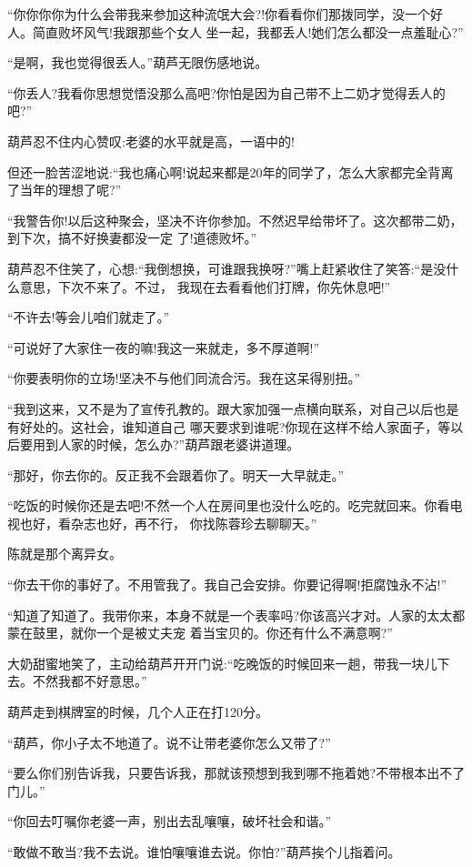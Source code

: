 \documentclass[11pt,a4paper,onecolumn]{article}
\begin{document}
``你你你你为什么会带我来参加这种流氓大会?!你看看你们那拨同学，没一个好人。简直败坏风气!我跟那些个女人
坐一起，我都丢人!她们怎么都没一点羞耻心?''

``是啊，我也觉得很丢人。''葫芦无限伤感地说。

``你丢人?我看你思想觉悟没那么高吧?你怕是因为自己带不上二奶才觉得丢人的吧?''

葫芦忍不住内心赞叹:老婆的水平就是高，一语中的!

但还一脸苦涩地说:``我也痛心啊!说起来都是20年的同学了，怎么大家都完全背离了当年的理想了呢?''

``我警告你!以后这种聚会，坚决不许你参加。不然迟早给带坏了。这次都带二奶，到下次，搞不好换妻都没一定
了!道德败坏。''

葫芦忍不住笑了，心想:``我倒想换，可谁跟我换呀?''嘴上赶紧收住了笑答:``是没什么意思，下次不来了。不过，
我现在去看看他们打牌，你先休息吧!''

``不许去!等会儿咱们就走了。''

``可说好了大家住一夜的嘛!我这一来就走，多不厚道啊!''

``你要表明你的立场!坚决不与他们同流合污。我在这呆得别扭。''

``我到这来，又不是为了宣传孔教的。跟大家加强一点横向联系，对自己以后也是有好处的。这社会，谁知道自己
哪天要求到谁呢?你现在这样不给人家面子，等以后要用到人家的时候，怎么办?''葫芦跟老婆讲道理。

``那好，你去你的。反正我不会跟着你了。明天一大早就走。''

``吃饭的时候你还是去吧!不然一个人在房间里也没什么吃的。吃完就回来。你看电视也好，看杂志也好，再不行，
你找陈蓉珍去聊聊天。''

陈就是那个离异女。

``你去干你的事好了。不用管我了。我自己会安排。你要记得啊!拒腐蚀永不沾!''

``知道了知道了。我带你来，本身不就是一个表率吗?你该高兴才对。人家的太太都蒙在鼓里，就你一个是被丈夫宠
着当宝贝的。你还有什么不满意啊?''

大奶甜蜜地笑了，主动给葫芦开开门说:``吃晚饭的时候回来一趟，带我一块儿下去。不然我都不好意思。''

葫芦走到棋牌室的时候，几个人正在打120分。

``葫芦，你小子太不地道了。说不让带老婆你怎么又带了?''

``要么你们别告诉我，只要告诉我，那就该预想到我到哪不拖着她?不带根本出不了门儿。''

``你回去叮嘱你老婆一声，别出去乱嚷嚷，破坏社会和谐。''

``敢做不敢当?我不去说。谁怕嚷嚷谁去说。你怕?''葫芦挨个儿指着问。
\end{document}
